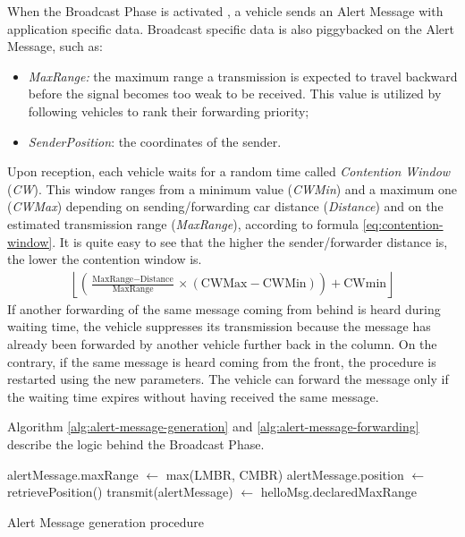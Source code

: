 		
		When the Broadcast Phase is activated , a vehicle sends an Alert Message with application specific data. Broadcast specific data is also piggybacked on the Alert Message, such as:
		\begin{itemize}
			\item \textit{MaxRange:} the maximum range a transmission is expected to travel backward before the signal becomes too weak to be received. This value is utilized by following vehicles to rank their forwarding priority;
			\item \textit{SenderPosition}: the coordinates of the sender.
		\end{itemize}
		Upon reception, each vehicle waits for a random time called \textit{Contention Window} (\textit{CW}). This window ranges from a minimum value (\textit{CWMin}) and a maximum one (\textit{CWMax}) depending on sending/forwarding car distance (\textit{Distance}) and on the estimated transmission range (\textit{MaxRange}), according to formula \ref{eq:contention-window}. It is quite easy to see that the higher the sender/forwarder distance is, the lower the contention window is.
		\begin{gather}
			\left\lfloor \left( \frac{\text{MaxRange} - \text{Distance}}{\text{MaxRange}} \times (\text{CWMax} - \text{CWMin}) \right) + \text{CWmin}  \right\rfloor
			\label{eq:contention-window}
		\end{gather}
		If another forwarding of the same message coming from behind is heard during waiting time, the vehicle suppresses its transmission because the message has already been forwarded by another vehicle further back in the column. On the contrary, if the same message is heard coming from the front, the procedure is restarted using the new parameters. The vehicle can forward the message only if the waiting time expires without having received the same message.
		
		Algorithm \ref{alg:alert-message-generation} and \ref{alg:alert-message-forwarding} describe the logic behind the Broadcast Phase.
		
		\begin{algorithm}[H]
			\begin{algorithmic}[1]
				\State alertMessage.maxRange $\gets$ max(LMBR, CMBR)
				\State alertMessage.position $\gets$ retrievePosition()
				\State transmit(alertMessage) $\gets$ helloMsg.declaredMaxRange
			\end{algorithmic}
			\caption{Alert Message generation procedure}
			\label{alg:alert-message-generation}
		\end{algorithm}
	
